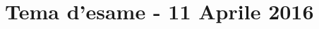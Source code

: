 \documentclass[\main/main.tex]{subfiles}
\begin{document}
\section{Tema d'esame - 11 Aprile 2016}



\end{document}
